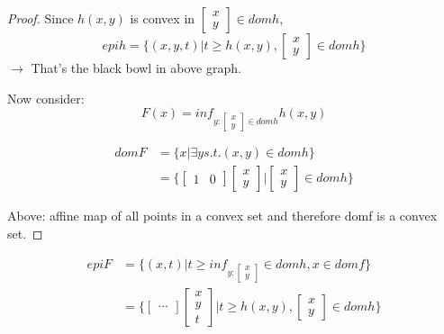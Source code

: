 \begin{proof}
	Since $h(x,y)$ is convex in $\begin{bmatrix}
	x\\
	y
	\end{bmatrix}\in domh$,
	\begin{equation*}
	epih = \{(x,y,t)|t\geq h(x,y), \begin{bmatrix}
	x\\
	y
	\end{bmatrix}\in domh \}
	\end{equation*}
	$\rightarrow$ That's the black bowl in above graph. 
	
	Now consider:
	\begin{equation*}
	F(x) = inf_{y:\begin{bmatrix}
		x\\
		y
		\end{bmatrix}\in domh}h(x,y)
	\end{equation*}
	
	\begin{align*}
	domF &= \{x|\exists y s.t. (x,y)\in domh \}\\
	&= \{\begin{bmatrix}
	1&0
	\end{bmatrix}\begin{bmatrix}
	x\\
	y
	\end{bmatrix} \vert \begin{bmatrix}
	x\\
	y
	\end{bmatrix}\in domh \}
	\end{align*}
	
	Above: affine map of all points in a convex set and therefore domf is a convex set.
\end{proof}

\begin{align*}
epiF &= \{(x,t)|t\geq inf_{y:\begin{bmatrix}
	x\\
	y
	\end{bmatrix}}\in domh, x\in domf \}\\
&= \{\begin{bmatrix}
\cdots
\end{bmatrix}\begin{bmatrix}
x\\
y\\
t
\end{bmatrix}\vert t\geq h(x,y), \begin{bmatrix}
x\\
y
\end{bmatrix}\in domh \}
\end{align*}

